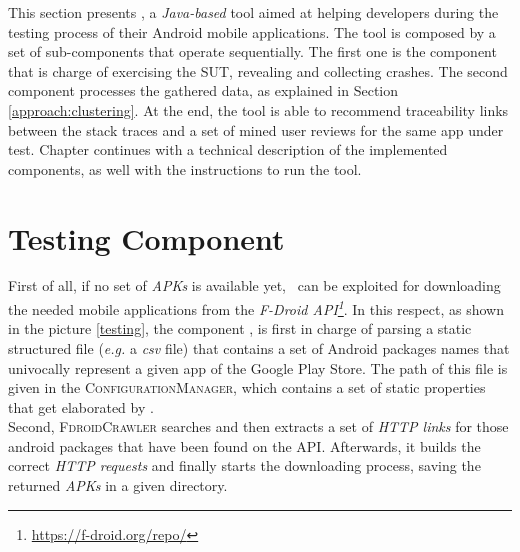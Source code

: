 \label{chapter:tool}
This section presents \toolname, a \textit{Java-based} tool aimed at helping  developers during the testing process of their Android mobile applications. The tool is composed by a set of sub-components that operate sequentially. The first one is the component that is charge of exercising the SUT, revealing and collecting crashes. The second component processes the gathered data, as explained in Section \ref{approach:clustering}. At the end, the tool is able to recommend traceability links between the stack traces and a set of mined user reviews for the same app under test. Chapter continues with a technical description of the implemented components, as well with the instructions to run the tool.


\section{Testing Component}
\label{tool: testing}
First of all, if no set of \textit{APKs} is available yet, \toolname\ can be exploited for downloading the needed mobile applications from the \textit{F-Droid API\footnote{\url{https://f-droid.org/repo/}}}. In this respect, as shown in the picture \ref{testing}, the component \FDroidCrawler, is first in charge of  parsing a static structured file (\textit{e.g.} a \textit{csv} file) that contains a set of Android packages names that univocally represent a given app of the Google Play Store. 
The path of this file is given in the \textsc{ConfigurationManager}, which contains a set of static properties that get elaborated by \toolname. \\
Second, \textsc{FdroidCrawler} searches and then extracts a set of \textit{HTTP links} for those android packages that have been found on the API. Afterwards, it builds the correct \textit{HTTP requests} and finally starts the downloading process, saving the returned \textit{APKs} in a given directory.

